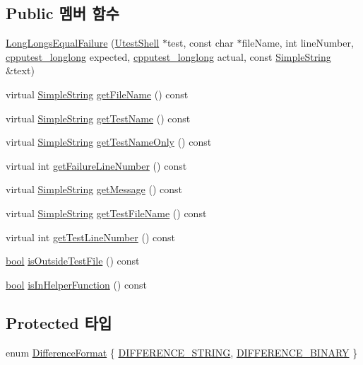 \subsection*{Public 멤버 함수}
\begin{DoxyCompactItemize}
\item 
\hyperlink{class_long_longs_equal_failure_afb87d73dd92d86df271e93bc21b19bac}{Long\+Longs\+Equal\+Failure} (\hyperlink{class_utest_shell}{Utest\+Shell} $\ast$test, const char $\ast$file\+Name, int line\+Number, \hyperlink{structcpputest__longlong}{cpputest\+\_\+longlong} expected, \hyperlink{structcpputest__longlong}{cpputest\+\_\+longlong} actual, const \hyperlink{class_simple_string}{Simple\+String} \&text)
\item 
virtual \hyperlink{class_simple_string}{Simple\+String} \hyperlink{class_test_failure_ac74fa65c497d9a175304a14ffafcaa1a}{get\+File\+Name} () const 
\item 
virtual \hyperlink{class_simple_string}{Simple\+String} \hyperlink{class_test_failure_a02da3865d8c38e5fd122a08a5e23773e}{get\+Test\+Name} () const 
\item 
virtual \hyperlink{class_simple_string}{Simple\+String} \hyperlink{class_test_failure_ac5e7fcbcf3831504c42ee41691b0a7e7}{get\+Test\+Name\+Only} () const 
\item 
virtual int \hyperlink{class_test_failure_a9d41f8ad9667ed1f471676d49a655ec7}{get\+Failure\+Line\+Number} () const 
\item 
virtual \hyperlink{class_simple_string}{Simple\+String} \hyperlink{class_test_failure_a55ca73e984d01e477b9cc990acf7dffd}{get\+Message} () const 
\item 
virtual \hyperlink{class_simple_string}{Simple\+String} \hyperlink{class_test_failure_a2fb8d164bb0730492e0140ec8080f13f}{get\+Test\+File\+Name} () const 
\item 
virtual int \hyperlink{class_test_failure_a9fd9b831dfada83bbc2a1847918080a6}{get\+Test\+Line\+Number} () const 
\item 
\hyperlink{avb__gptp_8h_af6a258d8f3ee5206d682d799316314b1}{bool} \hyperlink{class_test_failure_a977b24b749f7dc0d279fed902991c7b4}{is\+Outside\+Test\+File} () const 
\item 
\hyperlink{avb__gptp_8h_af6a258d8f3ee5206d682d799316314b1}{bool} \hyperlink{class_test_failure_a8658daf09d68f724672ed9c7b1d94e95}{is\+In\+Helper\+Function} () const 
\end{DoxyCompactItemize}
\subsection*{Protected 타입}
\begin{DoxyCompactItemize}
\item 
enum \hyperlink{class_test_failure_aaadecd271c82449768993cbf919de0a2}{Difference\+Format} \{ \hyperlink{class_test_failure_aaadecd271c82449768993cbf919de0a2a1246a1a469970104212c9113e3f057c9}{D\+I\+F\+F\+E\+R\+E\+N\+C\+E\+\_\+\+S\+T\+R\+I\+NG}, 
\hyperlink{class_test_failure_aaadecd271c82449768993cbf919de0a2af76cc43dfdf0618b3cb16196894d5929}{D\+I\+F\+F\+E\+R\+E\+N\+C\+E\+\_\+\+B\+I\+N\+A\+RY}
 \}
\end{DoxyCompactItemize}
